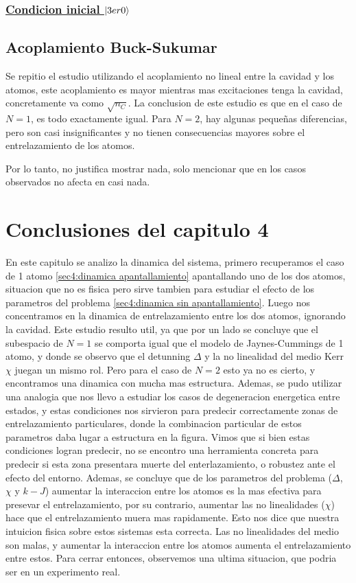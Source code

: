 \subsubsection{\underline{Condicion inicial $\ket{3er0}$}}


\subsection{Acoplamiento Buck-Sukumar}
Se repitio el estudio utilizando el acoplamiento no lineal entre la cavidad y los atomos, este acoplamiento es mayor mientras mas excitaciones tenga la cavidad, concretamente va como $\sqrt{n_C}$. 
La conclusion de este estudio es que en el caso de $N=1$, es todo exactamente igual. Para $N=2$, hay algunas pequeñas diferencias, pero son casi insignificantes y no tienen consecuencias mayores sobre el entrelazamiento de los atomos. 

Por lo tanto, no justifica mostrar nada, solo mencionar que en los casos observados no afecta en casi nada.

\section{Conclusiones del capitulo 4}
En este capitulo se analizo la dinamica del sistema, primero recuperamos el caso de 1 atomo \ref{sec4:dinamica apantallamiento} apantallando uno de los dos atomos, situacion que no es fisica pero sirve tambien para estudiar el efecto de los parametros del problema \ref{sec4:dinamica sin apantallamiento}. Luego nos concentramos en la dinamica de entrelazamiento entre los dos atomos, ignorando la cavidad. Este estudio resulto util, ya que por un lado se concluye que el subespacio de $N=1$ se comporta igual que el modelo de Jaynes-Cummings de 1 atomo, y donde se observo que el detunning $\Delta$ y la no linealidad del medio Kerr $\chi$ juegan un mismo rol. Pero para el caso de $N=2$ esto ya no es cierto, y encontramos una dinamica con mucha mas estructura. Ademas, se pudo utilizar una analogia que nos llevo a estudiar los casos de degeneracion energetica entre estados, y estas condiciones nos sirvieron para predecir correctamente zonas de entrelazamiento particulares, donde la combinacion particular de estos parametros daba lugar a estructura en la figura. Vimos que si bien estas condiciones logran predecir, no se encontro una herramienta concreta para predecir si esta zona presentara muerte del enterlazamiento, o robustez ante el efecto del entorno. Ademas, se concluye que de los parametros del problema ($\Delta$, $\chi$ y $k-J$) aumentar la interaccion entre los atomos es la mas efectiva para presevar el entrelazamiento, por su contrario, aumentar las no linealidades ($\chi$) hace que el entrelazamiento muera mas rapidamente. Esto nos dice que nuestra intuicion fisica sobre estos sistemas esta correcta. Las no linealidades del medio son malas, y aumentar la interaccion entre los atomos aumenta el entrelazamiento entre estos. Para cerrar entonces, observemos una ultima situacion, que podria ser en un experimento real.

